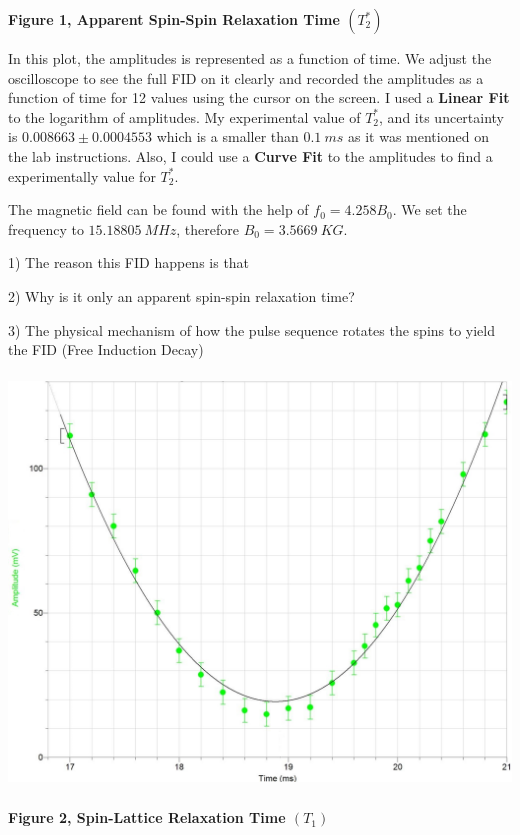 \documentclass[fleqn]{article}
\begin{document}
  \textbf{Figure 1, Apparent Spin-Spin Relaxation Time $(T_2^*)$}

  \vspace{10px}

  In this plot, the amplitudes is represented as a function of time. We adjust the oscilloscope to see 
  the full FID on it clearly and recorded the amplitudes as a function of time for 12 values using the cursor on the 
  screen. I used a \textbf{Linear Fit} to the logarithm of amplitudes. My experimental value of $T_2^*$, and its uncertainty 
  is $0.008663 \pm 0.0004553$ which is a smaller than $0.1 ~ ms$ as it was mentioned on the lab instructions. Also, I could use a 
  \textbf{Curve Fit} to the amplitudes to find a experimentally value for $T_2^*$.

  \vspace{10px}

  The magnetic field can be found with the help of $f_0=4.258 B_0$. We set the frequency to $15.18805 ~ MHz$, 
  therefore $B_0=3.5669 ~ KG$.  

  1) The reason this FID happens is that

  2) Why is it only an apparent spin-spin relaxation time?

  3) The physical mechanism of how the pulse sequence rotates the spins to yield the FID (Free Induction Decay)

  \pagebreak

  \includegraphics[height=11cm, width=15cm]{Fig2.JPG}

  \textbf{Figure 2, Spin-Lattice Relaxation Time $(T_1)$}
\end{document}

